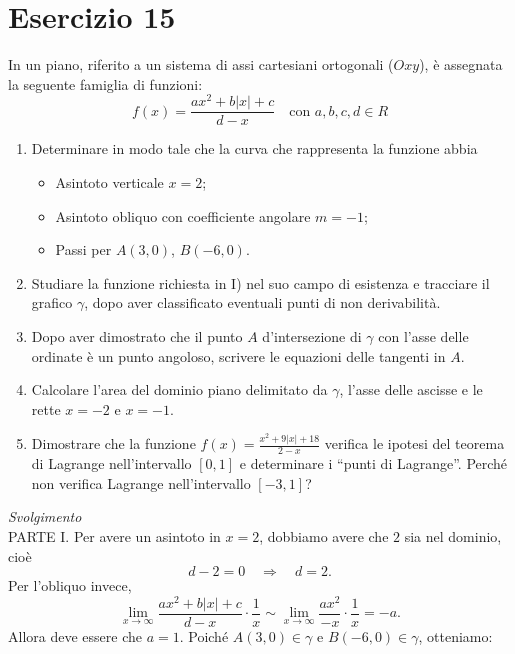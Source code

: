 \documentclass{article}
\begin{document}
\section*{Esercizio 15}
In un piano, riferito a un sistema di assi cartesiani ortogonali (\(Oxy\)), è assegnata la seguente famiglia di funzioni:
\[
f(x) = \frac{ax^2 + b|x| + c}{d - x} \quad \text{con } a, b, c, d \in R
\]

\begin{enumerate}[label=\Roman*] 
    \item Determinare in modo tale che la curva che rappresenta la funzione abbia
        \begin{itemize}
            \item Asintoto verticale $x = 2$;
            \item Asintoto obliquo con coefficiente angolare $m = -1$;
            \item Passi per $A(3, 0)$, $B(-6, 0)$.
        \end{itemize}
    
    \item Studiare la funzione richiesta in I) nel suo campo di esistenza e tracciare il grafico \(\gamma\), dopo aver classificato eventuali punti di non derivabilità.
    
    \item Dopo aver dimostrato che il punto \(A\) d’intersezione di \(\gamma\) con l’asse delle ordinate è un punto angoloso, scrivere le equazioni delle tangenti in \(A\).
    
    \item Calcolare l’area del dominio piano delimitato da \(\gamma\), l’asse delle ascisse e le rette \(x = -2\) e \(x = -1\).
    
    \item Dimostrare che la funzione \(f(x) = \frac{x^2 + 9|x| + 18}{2 - x}\) verifica le ipotesi del teorema di Lagrange nell’intervallo \([0, 1]\) e determinare i “punti di Lagrange”. Perché non verifica Lagrange nell’intervallo \([-3, 1]\)?
\end{enumerate}
\textit{Svolgimento}\\
PARTE I.
Per avere un asintoto in \(x = 2\), dobbiamo avere che \(2\) sia nel dominio, cioè
\[
d - 2 = 0 \quad \Rightarrow \quad d = 2.
\]
Per l’obliquo invece,
\[
\lim_{x \to \infty} \frac{ax^2 + b|x| + c}{d - x} \cdot \frac{1}{x} \sim \lim_{x \to \infty} \frac{ax^2}{-x} \cdot \frac{1}{x} = -a.
\]
Allora deve essere che \(a = 1\).
Poiché \(A(3, 0) \in \gamma\) e \(B(-6, 0) \in \gamma\), otteniamo:
\end{document}
